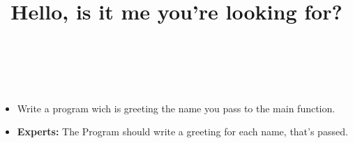 

\title{Hello, is it me you're looking for?} %
\author{} %
\renewcommand{\difficulty}{Medium} %
\renewcommand{\requirements}{Main function parameters, Pointers} %
\renewcommand{\aims}{Use the parameters for the main function} %


 \maketitle
 \taskinfos

\ \\\ \\

\begin{itemize}
	\item Write a program wich is greeting the name you pass to the main function.
	\item \textbf{Experts:} The Program should write a greeting for each name, that's passed.
\end{itemize}	
 
 


